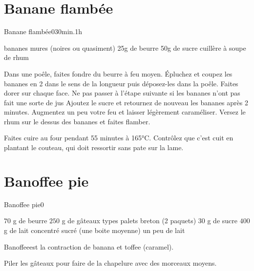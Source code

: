 {\section{Banane flambée}
\begin{recette}{Banane flambée}{0}{30min.}{1h}
\begin{ingredients}
 bananes mures (noires ou quasiment)
\ingredient 25g de beurre
\ingredient 50g de sucre
 cuillère à soupe de rhum
\end{ingredients}

\begin{preparation}
\etape Dans une poêle, faites fondre du beurre à feu moyen. Épluchez et coupez les bananes en 2 dans le sens de la longueur puis déposez-les dans la poêle.
\etape Faites dorer sur chaque face. Ne pas passer à l'étape suivante si les bananes n'ont pas fait une sorte de jus
\etape Ajoutez le sucre et retournez de nouveau les bananes après 2 minutes. Augmentez un peu votre feu et laisser légèrement caraméliser.
\etape Versez le rhum sur le dessus des bananes et faites flamber.
\end{preparation}

\begin{cuisson}
Faites cuire au four pendant 55 minutes à 165°C. Contrôlez 
que c'est cuit en plantant le couteau, qui doit ressortir sans pate sur la lame.
\end{cuisson}
\end{recette}

\section{Banoffee pie}
\begin{recette}{Banoffee pie}{0}{}{}
\begin{ingredients}
\ingredient $70$ g de beurre
\ingredient $250$ g de gâteaux types palets breton (2 paquets)
\ingredient $30$ g de sucre
\ingredient $400$ g de lait concentré sucré (une boite moyenne)
\ingredient un peu de lait
\end{ingredients}

\begin{remarque}
\og Banoffee\fg est la contraction de banana et toffee (caramel).
\end{remarque}

\begin{preparation}
\etape Piler les gâteaux pour faire de la chapelure avec des morceaux moyens.


\end{preparation}
\end{recette}}
